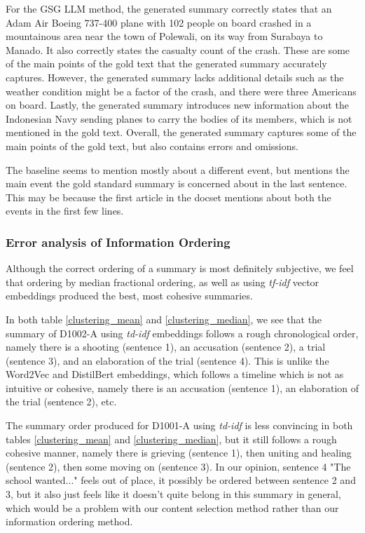 For the GSG LLM method, the generated summary correctly states that an Adam Air Boeing 737-400 plane with 102 people on board crashed in a mountainous area near the town of Polewali, on its way from Surabaya to Manado. It also correctly states the casualty count of the crash. These are some of the main points of the gold text that the generated summary accurately captures. However, the generated summary lacks additional details such as the weather condition might be a factor of the crash, and there were three Americans on board. Lastly, the generated summary introduces new information about the Indonesian Navy sending planes to carry the bodies of its members, which is not mentioned in the gold text. Overall, the generated summary captures some of the main points of the gold text, but also contains errors and omissions.

The baseline seems to mention mostly about a different event, but mentions the main event the gold standard summary is concerned about in the last sentence. This may be because the first article in the docset mentions about both the events in the first few lines.

\subsubsection{Error analysis of Information Ordering}

Although the correct ordering of a summary is most definitely subjective, we feel that ordering by median fractional ordering, as well as using \textit{tf-idf} vector embeddings produced the best, most cohesive summaries.

In both table \ref{clustering_mean} and \ref{clustering_median}, we see that the summary of D1002-A using \textit{td-idf} embeddings follows a rough chronological order, namely there is a shooting (sentence 1), an accusation (sentence 2), a trial (sentence 3), and an elaboration of the trial (sentence 4). This is unlike the Word2Vec and DistilBert embeddings, which follows a timeline which is not as intuitive or cohesive, namely there is an accusation (sentence 1), an elaboration of the trial (sentence 2), etc. 

The summary order produced for D1001-A using \textit{td-idf} is less convincing in both tables \ref{clustering_mean} and \ref{clustering_median}, but it still follows a rough cohesive manner, namely there is grieving (sentence 1), then uniting and healing (sentence 2), then some moving on (sentence 3). In our opinion, sentence 4 "The school wanted..." feels out of place, it possibly be ordered between sentence 2 and 3, but it also just feels like it doesn't quite belong in this summary in general, which would be a problem with our content selection method rather than our information ordering method. 

